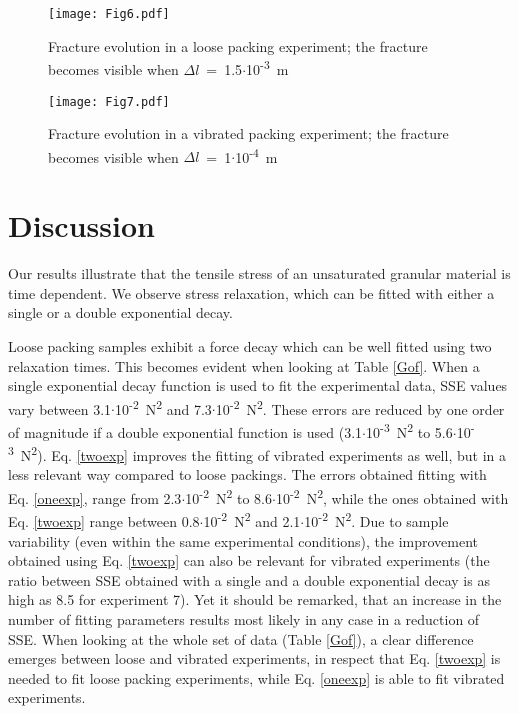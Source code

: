 \begin{figure}[h!]
\texttt{[image: Fig6.pdf]}
\caption{Fracture evolution in a loose packing experiment; the fracture becomes visible when $\Delta l$~=~1.5$\cdot$10\textsuperscript{-3}~\si{m}}
\label{Crack_loose}
\end{figure}

\begin{figure}[h!]
\texttt{[image: Fig7.pdf]}
\caption{Fracture evolution in a vibrated packing experiment; the fracture becomes visible when $\Delta l$~=~1$\cdot$10\textsuperscript{-4}~\si{m}}
\label{Crack_vibrated}
\end{figure}

\section{Discussion}
\label{sec:Discussion}

Our results illustrate that the tensile stress of an unsaturated granular material is time dependent. We observe stress relaxation, which can be fitted with either a single or a double exponential decay.

Loose packing samples exhibit a force decay which can be well fitted using two relaxation times. This becomes evident when looking at Table \ref{Gof}. When a single exponential decay function is used to fit the experimental data, SSE values vary between 3.1$\cdot$10\textsuperscript{-2}~\si{N^2} and 7.3$\cdot$10\textsuperscript{-2}~\si{N^2}. These errors are reduced by one order of magnitude if a double exponential function is used (3.1$\cdot$10\textsuperscript{-3}~\si{N^2} to 5.6$\cdot$10\textsuperscript{-3}~\si{N^2}). Eq. \eqref{twoexp} improves the fitting of vibrated experiments as well, but in a less relevant way compared to loose packings. The errors obtained fitting with Eq. \eqref{oneexp}, range from 2.3$\cdot$10\textsuperscript{-2}~\si{N^2} to 8.6$\cdot$10\textsuperscript{-2}~\si{N^2}, while the ones obtained with Eq. \eqref{twoexp} range between 0.8$\cdot$10\textsuperscript{-2}~\si{N^2} and 2.1$\cdot$10\textsuperscript{-2}~\si{N^2}. Due to sample variability (even within the same experimental conditions), the improvement obtained using Eq. \eqref{twoexp} can also be relevant for vibrated experiments (the ratio between SSE obtained with a single and a double exponential decay is as high as 8.5 for experiment 7). Yet it should be remarked, that an increase in the number of fitting parameters results most likely in any case in a reduction of SSE. When looking at the whole set of data (Table \ref{Gof}), a clear difference emerges between loose and vibrated experiments, in respect that Eq. \eqref{twoexp} is needed to fit loose packing experiments, while Eq. \eqref{oneexp} is able to fit vibrated experiments.

